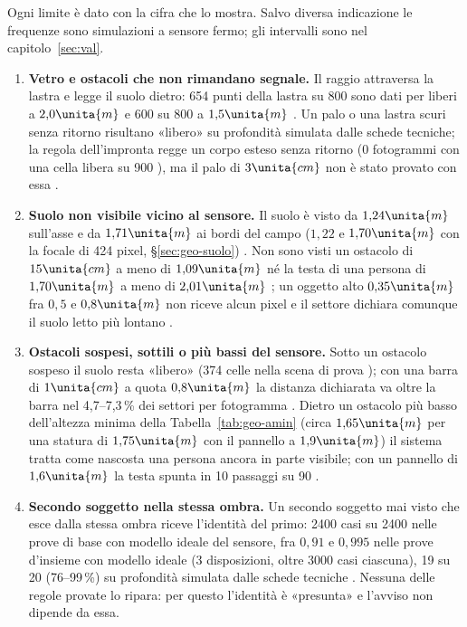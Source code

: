 Ogni limite è dato con la cifra che lo mostra. Salvo diversa indicazione le frequenze sono simulazioni a sensore fermo; gli intervalli sono nel capitolo~\ref{sec:val}.
\begin{enumerate}[label=\arabic*.,ref=\arabic*,leftmargin=1.8em]
\item \textbf{Vetro e ostacoli che non rimandano segnale.} Il raggio attraversa la lastra e legge il suolo dietro: 654 punti della lastra su 800 sono dati per liberi a $2{,}0\unita{m}$ e 600 su 800 a $1{,}5\unita{m}$ . Un palo o una lastra scuri senza ritorno risultano «libero» su profondità simulata dalle schede tecniche; la regola dell'impronta regge un corpo esteso senza ritorno (0 fotogrammi con una cella libera su 900 ), ma il palo di $3\unita{cm}$ non è stato provato con essa .
\item \textbf{Suolo non visibile vicino al sensore.} Il suolo è visto da $1{,}24\unita{m}$ sull'asse e da $1{,}71\unita{m}$ ai bordi del campo ($1{,}22$ e $1{,}70\unita{m}$ con la focale di 424 pixel, \S\ref{sec:geo-suolo}) . Non sono visti un ostacolo di $15\unita{cm}$ a meno di $1{,}09\unita{m}$ né la testa di una persona di $1{,}70\unita{m}$ a meno di $2{,}01\unita{m}$ ; un oggetto alto $0{,}35\unita{m}$ fra $0{,}5$ e $0{,}8\unita{m}$ non riceve alcun pixel e il settore dichiara comunque il suolo letto più lontano .
\item \textbf{Ostacoli sospesi, sottili o più bassi del sensore.} Sotto un ostacolo sospeso il suolo resta «libero» (374 celle nella scena di prova ); con una barra di $1\unita{cm}$ a quota $0{,}8\unita{m}$ la distanza dichiarata va oltre la barra nel 4,7--7,3\,\% dei settori per fotogramma . Dietro un ostacolo più basso dell'altezza minima della Tabella~\ref{tab:geo-amin} (circa $1{,}65\unita{m}$ per una statura di $1{,}75\unita{m}$ con il pannello a $1{,}9\unita{m}$) il sistema tratta come nascosta una persona ancora in parte visibile; con un pannello di $1{,}6\unita{m}$ la testa spunta in 10 passaggi su 90 .
\item \textbf{Secondo soggetto nella stessa ombra.} Un secondo soggetto mai visto che esce dalla stessa ombra riceve l'identità del primo: 2400 casi su 2400 nelle prove di base con modello ideale del sensore, fra $0{,}91$ e $0{,}995$ nelle prove d'insieme con modello ideale (3 disposizioni, oltre 3000 casi ciascuna), 19 su 20 (76--99\,\%) su profondità simulata dalle schede tecniche . Nessuna delle regole provate lo ripara: per questo l'identità è «presunta» e l'avviso non dipende da essa.

\end{enumerate}
